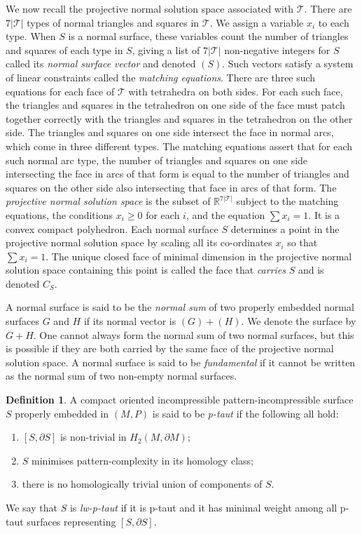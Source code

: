 \documentclass[oneside]{amsart}
\numberwithin{equation}{section}
\theoremstyle{plain}
\theoremstyle{definition}
\newtheorem{definition}[equation]{Definition}
\begin{document}
We now recall the projective normal solution space associated with $\mathcal{T}$. There are $7|\mathcal{T}|$ types of
normal triangles and squares in $\mathcal{T}$. We assign a variable $x_i$ to each type. When $S$ is a normal surface,
these variables count the number of triangles and squares of each type in $S$, giving a list of $7|\mathcal{T}|$ non-negative integers for
$S$ called its \emph{normal surface vector} and denoted $(S)$. Such vectors satisfy a system of linear constraints called the \emph{matching
equations}. There are three such equations for each face of $\mathcal{T}$ with tetrahedra on both sides. For each such face,
the triangles and squares in the tetrahedron on one side of the face must patch together correctly with the
triangles and squares in the tetrahedron on the other side. The triangles and squares on one side intersect the
face in normal arcs, which come in three different types. The matching equations assert that for each such normal
arc type, the number of triangles and squares on one side intersecting the face in arcs of that form is equal to the
number of triangles and squares on the other side also intersecting that face in arcs of that form.
The \emph{projective normal solution space} is the subset of $\mathbb{R}^{7|\mathcal{T}|}$ subject to the matching equations, the conditions
$x_i \geq 0$ for each $i$, and the equation $\sum x_i  = 1$. It is a convex compact polyhedron.
Each normal surface $S$ determines a point in the projective normal solution space by scaling all its co-ordinates $x_i$
so that $\sum x_i = 1$. The unique closed face of minimal dimension in the projective normal solution space containing this point
is called the face that \emph{carries} $S$ and is denoted $C_S$.

A normal surface is said to be the \emph{normal sum} of two properly embedded normal surfaces $G$ and $H$ if its normal vector is
$(G) + (H)$. We denote the surface by $G+H$. One cannot always form the normal sum of two normal surfaces, but this is possible if they are both carried by the same face of the projective normal solution space. A normal surface is said to be \emph{fundamental} if it cannot be written as the normal sum of two non-empty normal surfaces.

\begin{definition}
A compact oriented incompressible pattern-incompressible surface $S$ properly embedded in $(M,P)$ is said to be \emph{p-taut} if the following all hold:
\begin{enumerate}
\item $[S,\partial S]$ is non-trivial in $H_2(M, \partial M)$;
\item $S$ minimises pattern-complexity in its homology class;
\item there is no homologically trivial union of components of $S$.
\end{enumerate}
We say that $S$ is \emph{lw-p-taut} if it is p-taut and it has minimal weight among all p-taut surfaces representing $[S,\partial S]$.
\end{definition}
\end{document}
